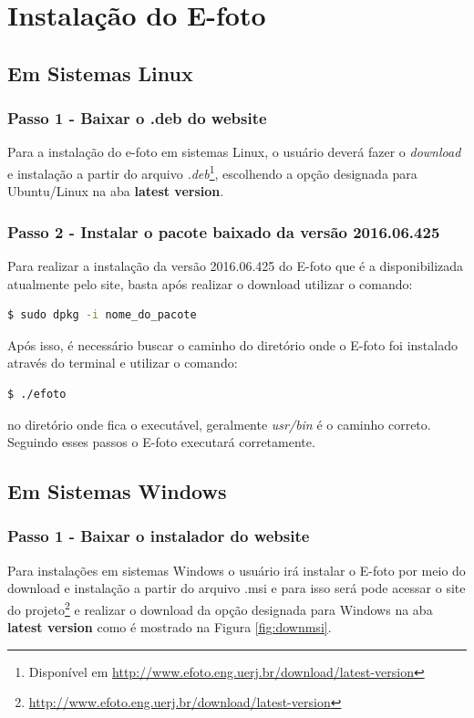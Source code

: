 \section{Instalação do E-foto}

\subsection{Em Sistemas Linux}

\subsubsection{Passo 1 - Baixar o .deb do website}

Para a instalação do e-foto em sistemas Linux, o usuário deverá fazer o \textit{download} e instalação a partir do arquivo \textit{.deb}\footnote{Disponível em  \url{http://www.efoto.eng.uerj.br/download/latest-version}}, escolhendo a opção designada para Ubuntu/Linux na aba \textbf{latest version}.

\subsubsection{Passo 2 - Instalar o pacote baixado da versão 2016.06.425}

Para realizar a instalação da versão 2016.06.425 do E-foto que é a disponibilizada atualmente pelo site,  basta após realizar o download utilizar o comando:

\begin{lstlisting}[language=bash]
	$ sudo dpkg -i nome_do_pacote
\end{lstlisting}

Após isso, é necessário buscar o caminho do diretório onde o E-foto foi instalado através do terminal e utilizar o comando:

\begin{lstlisting}[language=bash]
	$ ./efoto
\end{lstlisting}

no diretório onde fica o executável, geralmente \textit{usr/bin} é o caminho correto. Seguindo esses passos o E-foto executará corretamente.

\subsection{Em Sistemas Windows}

\subsubsection{Passo 1 - Baixar o instalador do website}
Para instalações em sistemas Windows o usuário irá instalar o E-foto por meio do download e instalação a partir do arquivo .msi e para isso será pode acessar o site do projeto\footnote{ \url{http://www.efoto.eng.uerj.br/download/latest-version}} e realizar o download da opção designada para Windows na aba \textbf{latest version} como é mostrado na Figura \ref{fig:downmsi}.

